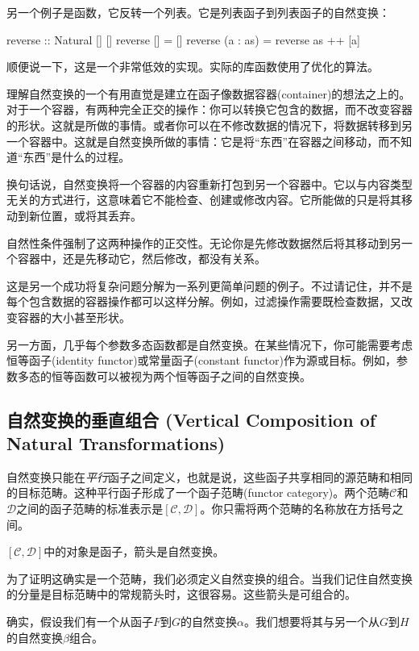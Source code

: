 \documentclass[DaoFP]{subfiles}
\begin{document}
    另一个例子是函数，它反转一个列表。它是列表函子到列表函子的自然变换：
    \begin{haskell}
        reverse :: Natural [] []
        reverse [] = []
        reverse (a : as) = reverse as ++ [a]
    \end{haskell}
    顺便说一下，这是一个非常低效的实现。实际的库函数使用了优化的算法。

    理解自然变换的一个有用直觉是建立在函子像数据容器(container)的想法之上的。对于一个容器，有两种完全正交的操作：你可以转换它包含的数据，而不改变容器的形状。这就是所做的事情。或者你可以在不修改数据的情况下，将数据转移到另一个容器中。这就是自然变换所做的事情：它是将“东西”在容器之间移动，而不知道“东西”是什么的过程。

    换句话说，自然变换将一个容器的内容重新打包到另一个容器中。它以与内容类型无关的方式进行，这意味着它不能检查、创建或修改内容。它所能做的只是将其移动到新位置，或将其丢弃。

    自然性条件强制了这两种操作的正交性。无论你是先修改数据然后将其移动到另一个容器中，还是先移动它，然后修改，都没有关系。

    这是另一个成功将复杂问题分解为一系列更简单问题的例子。不过请记住，并不是每个包含数据的容器操作都可以这样分解。例如，过滤操作需要既检查数据，又改变容器的大小甚至形状。

    另一方面，几乎每个参数多态函数都是自然变换。在某些情况下，你可能需要考虑恒等函子(identity functor)或常量函子(constant functor)作为源或目标。例如，参数多态的恒等函数可以被视为两个恒等函子之间的自然变换。

    \subsection{自然变换的垂直组合 (Vertical Composition of Natural Transformations)}

    自然变换只能在\emph{平行}函子之间定义，也就是说，这些函子共享相同的源范畴和相同的目标范畴。这种平行函子形成了一个函子范畴(functor category)。两个范畴$\mathcal{C}$和$\mathcal{D}$之间的函子范畴的标准表示是$[\mathcal{C}, \mathcal{D}]$。你只需将两个范畴的名称放在方括号之间。

    $[\mathcal{C}, \mathcal{D}]$中的对象是函子，箭头是自然变换。

    为了证明这确实是一个范畴，我们必须定义自然变换的组合。当我们记住自然变换的分量是目标范畴中的常规箭头时，这很容易。这些箭头是可组合的。

    确实，假设我们有一个从函子$F$到$G$的自然变换$\alpha$。我们想要将其与另一个从$G$到$H$的自然变换$\beta$组合。
\end{document}
